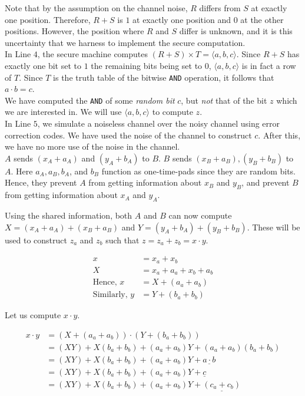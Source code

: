 \pagebreak

Note that by the assumption on the channel noise, $R$ differs from $S$ at exactly one position. Therefore, $R + S$ is $1$ at exactly one position and $0$ at the other positions. However, the position where $R$ and $S$ differ is unknown, and it is this uncertainty that we harness to implement the secure computation. \\

In Line $4$, the secure machine computes $(R + S) \times T = \langle a, b, c \rangle $. Since $R + S$ has exactly one bit set to $1$ the remaining bits being set to $0$, $\langle a, b, c \rangle$ is in fact a row of $T$. Since $T$ is the truth table of the bitwise \texttt{AND} operation, it follows that $a \cdot b = c$. \\

We have computed the \texttt{AND} of some \textit{random bit} $c$, but \textit{not} that of the bit $z$ which we are interested in. We will use $\langle a, b, c \rangle$ to compute $z$. \\

In Line $5$, we simulate a noiseless channel over the noisy channel using error correction codes. We have used the noise of the channel to construct $c$. After this, we have no more use of the noise in the channel. \\

$A$ sends $(x_A + a_A)$ and $(y_A + b_A)$ to $B$. $B$ sends $(x_B + a_B), (y_B + b_B)$ to $A$. Here $a_A, a_B, b_A$, and $b_B$ function as one-time-pads since they are random bits. Hence, they prevent $A$ from getting information about $x_B$ and $y_B$, and prevent $B$ from getting information about $x_A$ and $y_A$.

Using the shared information, both $A$ and $B$ can now compute $X = (x_A + a_A) + (x_B + a_B)$ and $Y = (y_A + b_A) + (y_B + b_B)$. These will be used to construct $z_a$ and $z_b$ such that $z = z_a + z_b = x \cdot y$.

\begin{align*}
x &= x_a + x_b \\
X &= x_a + a_a + x_b + a_b \\
\text{Hence, } x &= X + (a_a + a_b) \\
\text{Similarly, } y &= Y + (b_a + b_b) 
\end{align*}
  
Let us compute $x \cdot y$.

\begin{align*}
x  \cdot y &= (X + (a_a + a_b)) \cdot (Y + (b_a + b_b)) \\
&= (XY) + X(b_a + b_b) + (a_a + a_b)Y +  (a_a + a_b) (b_a + b_b) \\
&= (XY) + X(b_a + b_b) + (a_a + a_b)Y +  \underline{a \cdot b} \\
&= (XY) + X(b_a + b_b) + (a_a + a_b)Y +  \underline{c} \\
&= (XY) + X(b_a + b_b) + (a_a + a_b)Y +  \underline{(c_a + c_b)}
\end{align*}

